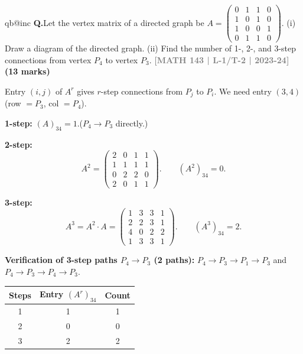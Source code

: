 \documentclass[12pt,a3paper]{article}
\makeatletter
\newcommand{\yr}[1]{\hfill\textcolor{gray}{\small\textbf{[#1]}}}
\newcommand{\mk}[1]{\textcolor{orange!70!black}{\small\textbf{(#1 marks)}}}
\newcounter{qnum}
\newcommand{\Q}[1]{%
  \csname qb@inc\endcsname
  \needspace{4\baselineskip}
  \refstepcounter{qnum}
  \vspace{6pt}
  \noindent\textbf{Q\theqnum.}\enspace #1\par
}
\makeatother
\begin{document}
\Q{Let the vertex matrix of a directed graph be $A = \begin{pmatrix} 0 & 1 & 1 & 0 \\ 1 & 0 & 1 & 0 \\ 1 & 0 & 0 & 1 \\ 0 & 1 & 1 & 0 \end{pmatrix}$. (i) Draw a diagram of the directed graph. (ii) Find the number of 1-, 2-, and 3-step connections from vertex $P_4$ to vertex $P_3$.
\yr{MATH 143 | L-1/T-2 | 2023-24} \mk{13}}
\begin{tcolorbox}[enhanced,breakable,
  colback=cA!4,colframe=cA,boxrule=0.8pt,arc=5pt,
  title={\textbf{Answer --- $r$-Step Connections $P_4\to P_3$
    for $A=\begin{pmatrix}0&1&1&0\\1&0&1&0\\1&0&0&1\\0&1&1&0\end{pmatrix}$}},
  fonttitle=\bfseries\color{white},colbacktitle=cA]

Entry $(i,j)$ of $A^r$ gives $r$-step connections from $P_j$ to $P_i$.
We need entry $(3,4)$ (row $=P_3$, col $=P_4$).

\textbf{1-step:} $(A)_{34} = 1$.\quad ($P_4\to P_3$ directly.) \checkmark

\textbf{2-step:}
\[
  A^2 = \begin{pmatrix}2&0&1&1\\1&1&1&1\\0&2&2&0\\2&0&1&1\end{pmatrix}.
  \qquad (A^2)_{34} = 0.
\]

\textbf{3-step:}
\[
  A^3 = A^2\cdot A = \begin{pmatrix}1&3&3&1\\2&2&3&1\\4&0&2&2\\1&3&3&1\end{pmatrix}.
  \qquad (A^3)_{34} = 2.
\]

\textbf{Verification of 3-step paths $P_4\to P_3$ (2 paths):}
$P_4\to P_3\to P_1\to P_3$ and $P_4\to P_3\to P_4\to P_3$.

\begin{center}
\begin{tabular}{ccc}
\toprule
Steps & Entry $(A^r)_{34}$ & Count \\
\midrule
1 & 1 & 1 \\
2 & 0 & 0 \\
3 & 2 & 2 \\
\bottomrule
\end{tabular}
\end{center}

\end{tcolorbox}
 
\end{document}
